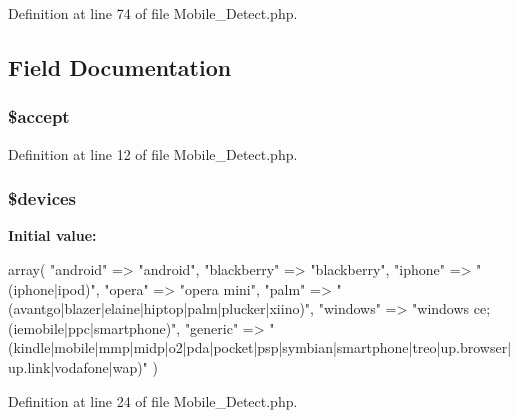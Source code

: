 \-Definition at line 74 of file \-Mobile\-\_\-\-Detect.\-php.




\subsection{\-Field \-Documentation}
\hypertarget{class_mobile___detect_a75fc18c4ff06288ff9fdf8aba9bd1081}{
\subsubsection[{\$accept}]{\setlength{\rightskip}{0pt plus 5cm}\$accept}}\label{class_mobile___detect_a75fc18c4ff06288ff9fdf8aba9bd1081}


\-Definition at line 12 of file \-Mobile\-\_\-\-Detect.\-php.

\hypertarget{class_mobile___detect_a004eefb786861fbe31e1f0f24662477b}{
\subsubsection[{\$devices}]{\setlength{\rightskip}{0pt plus 5cm}\$devices}}\label{class_mobile___detect_a004eefb786861fbe31e1f0f24662477b}
{\bfseries \-Initial value\-:}
\begin{DoxyCode}
 array(
        "android"       => "android",
        "blackberry"    => "blackberry",
        "iphone"        => "(iphone|ipod)",
        "opera"         => "opera mini",
        "palm"          => "(avantgo|blazer|elaine|hiptop|palm|plucker|xiino)",
        "windows"       => "windows ce; (iemobile|ppc|smartphone)",
        "generic"       => "
      (kindle|mobile|mmp|midp|o2|pda|pocket|psp|symbian|smartphone|treo|up.browser|up.link|vodafone|wap)"
    )
\end{DoxyCode}


\-Definition at line 24 of file \-Mobile\-\_\-\-Detect.\-php.

